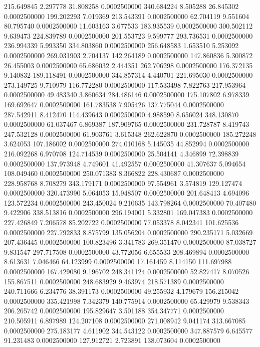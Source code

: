 215.649845 2.297778 31.808258 0.0002500000
340.684224 8.505288 26.845302 0.0002500000
199.202293 7.019369 213.543391 0.0002500000
62.704119 9.551604 80.795740 0.0002500000
11.603163 3.677533 183.935539 0.0002500000
300.502112 9.639473 224.839789 0.0002500000
201.553723 9.599777 293.736531 0.0002500000
236.994339 5.993350 334.803860 0.0002500000
256.648583 1.653510 5.253092 0.0002500000
269.031903 2.704137 142.264189 0.0002500000
147.860836 5.300872 26.455003 0.0002500000
65.686032 2.444351 262.706298 0.0002500000
176.372135 9.140832 189.118491 0.0002500000
344.857314 4.440701 221.695030 0.0002500000
273.149725 9.710979 116.772280 0.0002500000
117.533498 7.822763 217.953964 0.0002500000
49.483340 3.860634 284.486146 0.0002500000
175.107802 6.978339 169.692647 0.0002500000
161.783538 7.905426 137.775044 0.0002500000
287.542911 8.412470 114.439643 0.0002500000
4.988590 8.656024 348.130870 0.0002500000
61.037467 6.869387 187.909765 0.0002500000
231.728787 8.419743 247.532128 0.0002500000
61.903761 3.615348 262.622870 0.0002500000
185.272248 3.624053 107.186002 0.0002500000
274.010168 5.145035 44.852994 0.0002500000
216.092268 6.970708 124.714539 0.0002500000
25.504141 4.346899 72.398839 0.0002500000
137.973948 4.749601 41.492557 0.0002500000
41.307637 5.094654 108.049460 0.0002500000
250.071383 8.366822 228.430687 0.0002500000
228.958768 8.708279 343.179171 0.0002500000
97.554961 3.574819 129.127474 0.0002500000
320.473990 5.064053 15.948507 0.0002500000
201.648413 4.694096 123.572234 0.0002500000
243.450024 9.210635 143.798264 0.0002500000
70.407480 9.422906 338.513816 0.0002500000
296.194001 5.332801 169.047383 0.0002500000
227.426849 7.206578 85.202722 0.0002500000
77.053378 8.042341 101.625536 0.0002500000
227.792833 8.875799 135.056204 0.0002500000
290.235171 5.032669 207.436445 0.0002500000
100.823496 3.341783 269.351470 0.0002500000
87.038727 9.831547 297.717508 0.0002500000
43.772056 6.655533 208.469894 0.0002500000
8.613631 7.046466 64.123999 0.0002500000
17.161459 8.114150 111.697988 0.0002500000
167.429080 9.196702 248.341124 0.0002500000
52.827417 8.070526 155.867511 0.0002500000
248.683929 9.463974 218.571389 0.0002500000
240.711666 6.234776 38.391173 0.0002500000
49.255932 4.179679 156.215042 0.0002500000
335.421998 7.342379 140.775914 0.0002500000
65.429979 9.538343 206.265742 0.0002500000
195.829647 3.501188 354.347771 0.0002500000
210.505911 6.897989 124.207108 0.0002500000
271.008942 9.041174 313.667085 0.0002500000
275.183177 4.611902 344.543122 0.0002500000
347.887579 6.645577 91.231483 0.0002500000
127.912721 2.723891 138.073604 0.0002500000
